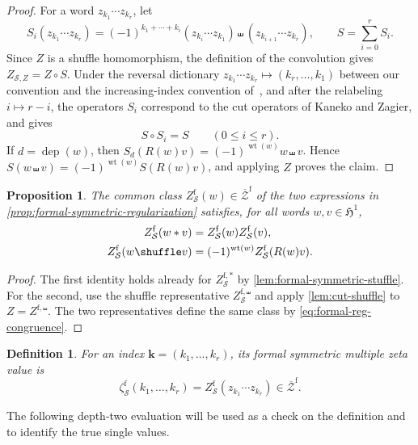 \documentclass[12pt]{amsart}
\numberwithin{equation}{section}
\theoremstyle{plain}
\newtheorem{prop}[prop]{Proposition}
\newtheorem{dfn}[dfn]{Definition}
\DeclareMathOperator{\wt}{wt}
\DeclareMathOperator{\dep}{dep}
\newcommand{\h}{\mathfrak H}
\newcommand{\Zbarf}{{\overline{\mathcal Z}^{\mathrm f}}}
\newcommand{\zsf}[1]{\zeta_{\mathcal S}^{\mathrm f}(#1)}
\begin{document}
\begin{proof}
For a word $z_{k_1}\cdots z_{k_r}$, let
\[
 S_i(z_{k_1}\cdots z_{k_r})
 =(-1)^{k_1+\cdots+k_i}
 (z_{k_i}\cdots z_{k_1})\shuffle
 (z_{k_{i+1}}\cdots z_{k_r}),
 \qquad S=\sum_{i=0}^rS_i.
\]
Since $Z$ is a shuffle homomorphism, the definition of the convolution gives
$Z_{\mathcal S,Z}=Z\circ S$. Under the reversal dictionary
$z_{k_1}\cdots z_{k_r}\mapsto(k_r,\ldots,k_1)$ between our convention and the
increasing-index convention of~\cite{KZ}, and after the relabeling
$i\mapsto r-i$, the operators $S_i$ correspond to the cut operators of Kaneko
and Zagier, and \cite[Proposition~10]{KZ} gives
\[
 S\circ S_i=S\qquad(0\leq i\leq r).
\]
If $d=\dep(w)$, then
$S_d(R(w)v)=(-1)^{\wt(w)}w\shuffle v$. Hence
$S(w\shuffle v)=(-1)^{\wt(w)}S(R(w)v)$, and applying $Z$ proves the claim.
\end{proof}

\begin{prop}\label{prop:formal-symmetric-properties}
The common class $Z_{\mathcal S}^{\mathrm f}(w)\in\Zbarf$ of the two expressions in \cref{prop:formal-symmetric-regularization} satisfies, for all words $w,v\in\h^1$,
\begin{align}\label{eq:formal-symmetric-relations}
 Z_{\mathcal S}^{\mathrm f}(w*v)&=Z_{\mathcal S}^{\mathrm f}(w)Z_{\mathcal S}^{\mathrm f}(v),\\
 Z_{\mathcal S}^{\mathrm f}(w\shuffle v)&=(-1)^{\wt(w)}Z_{\mathcal S}^{\mathrm f}(R(w)v).\notag
\end{align}
\end{prop}

\begin{proof}
The first identity holds already for $Z_{\mathcal S}^{\mathrm f,*}$ by \cref{lem:formal-symmetric-stuffle}. For the second, use the shuffle representative $Z_{\mathcal S}^{\mathrm f,\shuffle}$ and apply \cref{lem:cut-shuffle} to $Z=Z^{\mathrm f,\shuffle}$. The two representatives define the same class by \eqref{eq:formal-reg-congruence}.
\end{proof}

\begin{dfn}\label{def:formal-symmetric}
For an index $\boldsymbol{k}=(k_1,\ldots,k_r)$, its \emph{formal symmetric multiple zeta value} is
\[
 \zsf{k_1,\ldots,k_r}
 =Z_{\mathcal S}^{\mathrm f}(z_{k_1}\cdots z_{k_r})\in\Zbarf.
\]
\end{dfn}

The following depth-two evaluation will be used as a check on the definition and to identify the true single values.
\end{document}
